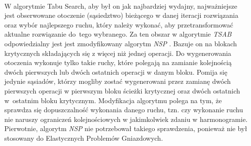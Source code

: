 \documentclass[archivemode]{mgr}
\begin{document}
\ \\W algorytmie Tabu Search, aby był on jak najbardziej wydajny, najważniejsze jest obserwowane otoczenie (sąsiedztwo) bieżącego w danej iteracji rozwiązania oraz wybór najlepszego ruchu, który należy wykonać, aby przetransformować aktualne rozwiązanie do~tego wybranego. Za ten obszar w algorytmie \emph{TSAB} odpowiedzialny jest jest zmodyfikowany algorytm \emph{NSP} \cite{Smutnicki96}. Bazuje on na blokach krytycznych składających się z więcej niż jednej operacji. Do wygenerowania otoczenia wykonuje tylko takie ruchy, które polegają na zamianie kolejnością dwóch pierwszych lub dwóch ostatnich operacji w danym bloku. Pomija się jedynie sąsiadów, którzy mogliby zostać wygenerowani przez zamianę dwóch pierwszych operacji w pierwszym bloku ścieżki krytycznej oraz dwóch ostatnich w~ostatnim bloku krytycznym. Modyfikacja algorytmu polega na tym, że sprawdza się dopuszczalność wykonania danego ruchu, tzn. czy wykonanie ruchu nie naruszy ograniczeń kolejnościowych w jakimkolwiek zdaniu w harmonogramie. Pierwotnie, algorytm \emph{NSP} nie potrzebował takiego sprawdzenia, ponieważ nie był stosowany do Elastycznych Problemów Gniazdowych.
\end{document}
